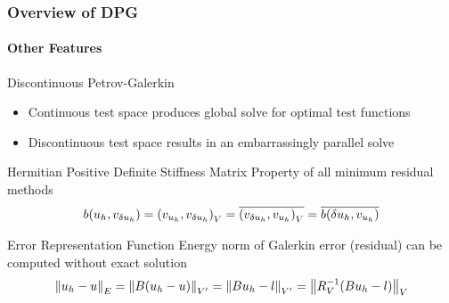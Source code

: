 \documentclass[18pt,xcolor=table]{beamer}
\begin{document}


\begin{frame}[t]
\frametitle{Overview of DPG}
\framesubtitle{Other Features}
\begin{block}{Discontinuous Petrov-Galerkin}
\begin{itemize}
  \item Continuous test space produces global solve for optimal test functions
  \item Discontinuous test space results in an embarrassingly parallel solve
\end{itemize}
\end{block}
\begin{block}{Hermitian Positive Definite Stiffness Matrix}
Property of all minimum residual methods
\[
b(u_h,v_{\delta u_h})=\left( v_{u_h},v_{\delta u_h} \right)_V=\overline{\left( v_{\delta u_h},v_{u_h} \right)_V}=\overline{b(\delta u_h,v_{u_h})}
\]
\end{block}
\begin{block}{Error Representation Function}
Energy norm of Galerkin error (residual) can be computed without exact solution
\[
\left\| u_h-u \right\|_E=\left\| B(u_h-u) \right\|_{V'}=\left\| Bu_h-l \right\|_{V'}=\left\| R_V^{-1}(Bu_h-l) \right\|_V
\]
\end{block}
\end{frame}
\end{document}
